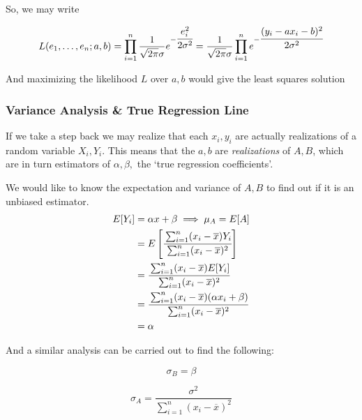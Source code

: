\documentclass[10pt]{article}
\begin{document}
So, we may write

\begin{equation}
	L(e_1, \ldots, e_n; a, b) = \prod^n_{i=1} \frac{1}{\sqrt{2\pi} \sigma} e^{-\cfrac{e_i^2}{2\sigma^2}} = \frac{1}{\sqrt{2\pi} \sigma} \prod^n_{i=1} e^{-\cfrac{(y_i - ax_i - b)^2}{2\sigma^2}}
\end{equation}

And maximizing the likelihood $ L $ over $ a, b $  would give the least squares solution

\subsubsection{Variance Analysis \& True Regression Line}

If we take a step back we may realize that each $ x_i, y_i $ are actually realizations of a random variable $ X_i, Y_i $. 
This means that the $ a, b $ are \textit{realizations} of $ A, B $, which are in turn estimators of $ \alpha, \beta , $ the `true regression coefficients'.


We would like to know the expectation and variance of $ A, B $ to find out if it is an unbiased estimator.
\begin{equation}
	\begin{split}
		E[Y_i] &= \alpha x + \beta \implies \mu_A = E[A] \\
					 &= E \left[ \cfrac{\sum^n_{i=1} (x_i - \overline{x})Y_i}{\sum^n_{i=1}(x_i - \overline{x})^2} \right]   \\
					 &= \cfrac{\sum^n_{i=1} (x_i - \overline{x})E[Y_i]}{\sum^n_{i=1}(x_i - \overline{x})^2}  \\
					 &= \cfrac{\sum^n_{i=1} (x_i - \overline{x})(\alpha x_i + \beta)}{\sum^n_{i=1}(x_i - \overline{x})^2}  \\
					 &= \alpha \\
	\end{split}
\end{equation}

And a similar analysis can be carried out to find the following:

\begin{equation}
	\sigma_B = \beta
\end{equation}

\begin{equation}
	\sigma_A = \frac{\sigma^2}{\sum^n_{i=1}(x_i - \overline{x})^2}
\end{equation}
\end{document}
